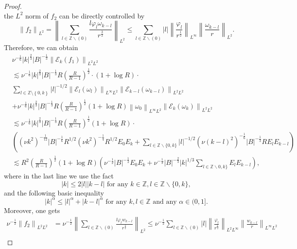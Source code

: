 \documentclass[final, 12pt,reqno]{amsart}
\numberwithin{equation}{section}
\begin{document}
\begin{proof}
$$$$
the $L^2$ norm of $f_2$ can be directly controlled by
$$
\left\|f_2\right\|_{L^2}=\left\|\sum_{l \in \mathbb{Z} \backslash(0)} \frac{l \varphi_l \omega_{k-l}}{r^{\frac{3}{2}}}\right\|_{L^2} \leq \sum_{l \in \mathbb{Z} \backslash(0)}|l|\left\|\frac{\varphi_l}{r^{\frac{1}{2}}}\right\|_{L^{\infty}}\left\|\frac{\omega_{k-l}}{r}\right\|_{L^2} .
$$
Therefore, we can obtain {\small \begin{equation}\label{6.14}
    \begin{aligned}
    &\nu^{-\frac{1}{6}}|k|^{\frac{2}{3}}|B|^{-\frac{1}{3}}\left\|\mathcal{E}_k (f_1)\right\|_{L^2 L^2}\\
     &\lesssim \nu^{-\frac{1}{6}}|k|^{\frac{2}{3}}|B|^{-\frac{1}{3}}R\left(\frac{R}{R-1}\right)^{\frac{1}{2}} \cdot(1+\log R) \cdot\\
 &\sum_{l \in \mathbb{Z} \setminus\left\lbrace 0, k\right\rbrace }|l|^{-1/2}\left\|\mathcal{E}_l(\omega_l)\right\|_{L^\infty L^2}\left\|\mathcal{E}_{k-l}(\omega_{k-l})\right\|_{L^2L^2}\\
 &+\nu^{-\frac{1}{6}}|k|^{\frac{2}{3}}|B|^{-\frac{1}{3}}R\left(\frac{R}{R-1}\right)^{\frac{1}{2}}(1+\log R)
 \left\|\omega_0\right\|_{L^\infty L^2}\left\|\mathcal{E}_k(\omega_k)\right\|_{L^2L^2} \\
&   \lesssim  \nu^{-\frac{1}{6}}|k|^{\frac{2}{3}}|B|^{-\frac{1}{3}}R \left(\frac{R}{R-1}\right)^{\frac{1}{2}}(1+\log R) \cdot \\
&    \left( \left(\nu k^2\right)^{-\frac{1}{12}}|B|^{-\frac{1}{6}} R^{1/2} (\nu k^2)^{-\frac{1}{4}}R^{1/2}E_0 E_k
 +\sum_{l \in \mathbb{Z} \backslash\{0, k\}}|l|^{-1/2}\left(\nu (k-l)^2\right)^{-\frac{1}{6}}|B|^{-\frac{1}{3}} R  E_l E_{k-l}\right) \\
&   \lesssim  R^2\left(\frac{R}{R-1}\right)^{\frac{1}{2}}(1+\log R)\left(\nu^{-\frac{1}{2}}|B|^{-\frac{1}{2}}E_0 E_k+\nu^{-\frac{1}{3}}|B|^{-\frac{2}{3}}|k|^{1/3}\sum_{l \in \mathbb{Z} \backslash 0, k\}} E_l E_{k-l}\right),
\end{aligned}
\end{equation}}
where in the last line we use the fact
$$
|k| \leq 2|l||k-l| \text { for any } k \in \mathbb{Z}, l \in \mathbb{Z} \backslash\{0, k\},
$$
and the following basic inequality $$|k|^\alpha
\leq|l|^\alpha+|k-l|^\alpha\text { for any } k, l \in \mathbb{Z}
\text { and any } \alpha \in(0,1].$$ Moreover, one gets
\begin{equation}\label{6.15}
    \begin{aligned}
        \nu^{-\frac{1}{2}}\left\|f_2\right\|_{L^2L^2}&=\nu^{-\frac{1}{2}}\left\|\sum_{l \in \mathbb{Z} \backslash(0)} \frac{l \varphi_l w_{k-l}}{r^{\frac{3}{2}}}\right\|_{L^2} \leq \nu^{-\frac{1}{2}}\sum_{l \in \mathbb{Z} \backslash(0)}|l|\left\|\frac{\varphi_l}{r^{\frac{1}{2}}}\right\|_{L^2L^{\infty}}\left\|\frac{w_{k-l}}{r}\right\|_{L^\infty L^2}\\

\end{aligned}
\end{equation}
\end{proof}
\end{document}
